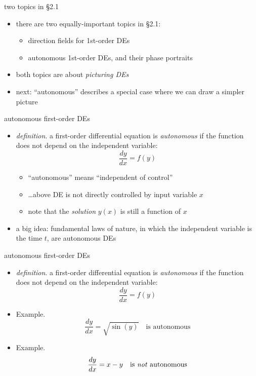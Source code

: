 \documentclass[colorlinks]{beamer}
\begin{document}
\begin{frame}{two topics in \S 2.1}

\begin{itemize}
\item there are two equally-important topics in \S 2.1:
    \begin{itemize}
    \item \alert{direction fields} for 1st-order DEs
    \item \alert{autonomous} 1st-order DEs, and their \alert{phase portraits}
    \end{itemize}
\item both topics are about \emph{picturing DEs}

\bigskip
\item next: ``autonomous'' describes a special case where we can draw a simpler picture
\end{itemize}
\end{frame}


\begin{frame}{autonomous first-order DEs}

\begin{itemize}
\item \emph{definition}. a first-order differential equation is \emph{autonomous} if the function does not depend on the independent variable:
    $$\frac{dy}{dx} = f(y)$$

\medskip
    \begin{itemize}
    \item ``autonomous'' means ``independent of control''
    \item \dots above DE is not directly controlled by input variable $x$
    \item note that the \emph{solution} $y(x)$ is still a function of $x$
    \end{itemize}

\bigskip
\item a big idea: fundamental laws of nature, in which the independent variable is the time $t$, are autonomous DEs
\end{itemize}
\end{frame}


\begin{frame}{autonomous first-order DEs}

\begin{itemize}
\item \emph{definition}. a first-order differential equation is \emph{autonomous} if the function does not depend on the independent variable:
    $$\frac{dy}{dx} = f(y)$$

\bigskip
\item Example.
    $$\frac{dy}{dx} = \sqrt{\sin(y)} \quad \text{is autonomous}$$
\item Example.
    $$\frac{dy}{dx} = x-y \quad \text{is \emph{not} autonomous}$$
\end{itemize}
\end{frame}
\end{document}
